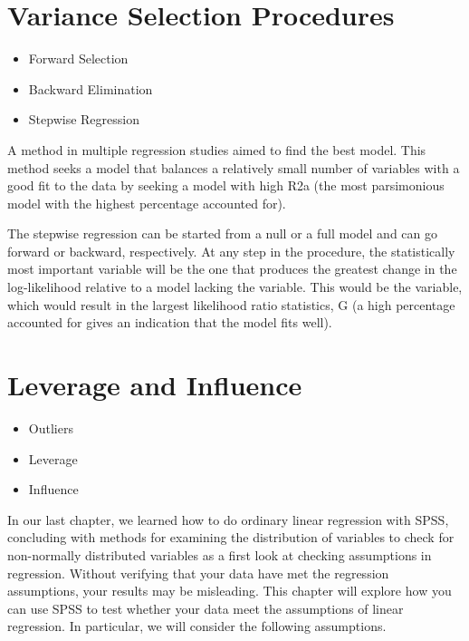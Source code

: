\documentclass[12pt, a4paper]{report}
\begin{document}
\newpage
\section{Variance Selection Procedures}
\begin{itemize}
\item Forward Selection
\item Backward Elimination
\item Stepwise Regression
\end{itemize}

A method in multiple regression studies aimed to find the best model. This method seeks a model that balances a relatively small number of variables with a good fit to the data by seeking a model with high R2a (the most parsimonious model with the highest percentage accounted for).

The stepwise regression can be started from a null or a full model and can go forward or backward, respectively. At any step in the procedure, the statistically most important variable will be the one that produces the greatest change in the log-likelihood relative to a model lacking the variable. This would be the variable, which would result in the largest likelihood ratio statistics, G (a high percentage accounted for gives an indication that the model fits well).


\section{Leverage and Influence}
\begin{itemize}
\item Outliers
\item Leverage
\item Influence
\end{itemize}

In our last chapter, we learned how to do ordinary linear regression with SPSS, concluding with methods for examining the distribution of variables to check for non-normally distributed variables as a first look at checking assumptions in regression.  Without verifying that your data have met the regression assumptions, your results may be misleading.  This chapter will explore how you can use SPSS to test whether your data meet the assumptions of linear regression.  In particular, we will consider the following assumptions.
\end{document}
